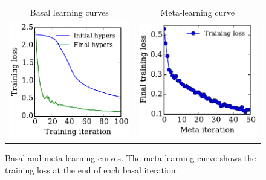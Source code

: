 \documentclass{article}
\newcommand{\primal}{basal}
\newcommand{\Primal}{Basal}
\begin{document}
\begin{figure}[h!]
\begin{center}
\begin{tabular}{cc}
 \Primal{} learning curves & Meta-learning curve \\
\hspace{-1em}\includegraphics[width=0.5\columnwidth, height=0.5\columnwidth]{../experiments/Feb_3_training_schedules/3_adam_50/learning_curves_paper.pdf} &
\hspace{-1em}\includegraphics[width=0.5\columnwidth, height=0.5\columnwidth]{../experiments/Feb_3_training_schedules/3_adam_50/meta_learning_curve_paper.pdf}
\end{tabular}
\vskip -0.1in
\caption{\Primal{} and meta-learning curves.
The meta-learning curve shows the training loss at the end of each \primal{} iteration.}
\label{fig:learning curves}
\end{center}
\vskip -0.2in
\end{figure}
\end{document}
